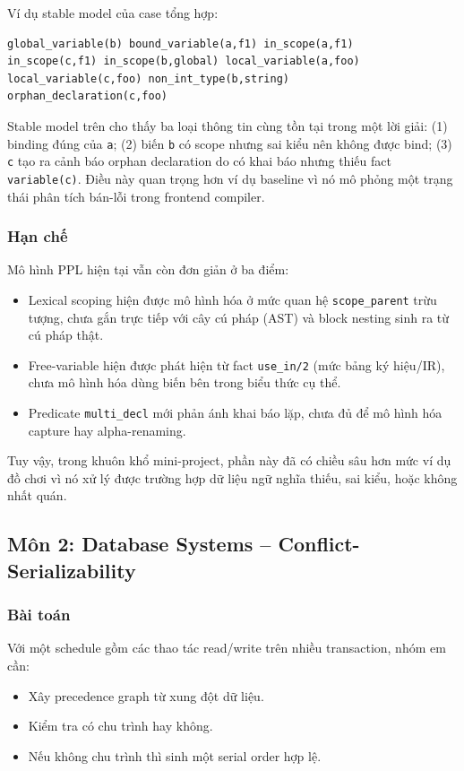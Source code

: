 ﻿\documentclass[11pt,a4paper]{article}
\begin{document}
Ví dụ stable model của case tổng hợp:
\begin{lstlisting}[language={}]
global_variable(b) bound_variable(a,f1) in_scope(a,f1)
in_scope(c,f1) in_scope(b,global) local_variable(a,foo)
local_variable(c,foo) non_int_type(b,string)
orphan_declaration(c,foo)
\end{lstlisting}

Stable model trên cho thấy ba loại thông tin cùng tồn tại trong một lời giải: (1) binding đúng của \texttt{a}; (2) biến \texttt{b} có scope nhưng sai kiểu nên không được bind; (3) \texttt{c} tạo ra cảnh báo orphan declaration do có khai báo nhưng thiếu fact \texttt{variable(c)}. Điều này quan trọng hơn ví dụ baseline vì nó mô phỏng một trạng thái phân tích bán-lỗi trong frontend compiler.

\subsubsection*{Hạn chế}
Mô hình PPL hiện tại vẫn còn đơn giản ở ba điểm:
\begin{itemize}[leftmargin=1.5em]
  \item Lexical scoping hiện được mô hình hóa ở mức quan hệ \texttt{scope\_parent} trừu tượng, chưa gắn trực tiếp với cây cú pháp (AST) và block nesting sinh ra từ cú pháp thật.
  \item Free-variable hiện được phát hiện từ fact \texttt{use\_in/2} (mức bảng ký hiệu/IR), chưa mô hình hóa dùng biến bên trong biểu thức cụ thể.
  \item Predicate \texttt{multi\_decl} mới phản ánh khai báo lặp, chưa đủ để mô hình hóa capture hay alpha-renaming.
\end{itemize}
Tuy vậy, trong khuôn khổ mini-project, phần này đã có chiều sâu hơn mức ví dụ đồ chơi vì nó xử lý được trường hợp dữ liệu ngữ nghĩa thiếu, sai kiểu, hoặc không nhất quán.

\subsection{Môn 2: Database Systems -- Conflict-Serializability}
\subsubsection*{Bài toán}
Với một schedule gồm các thao tác read/write trên nhiều transaction, nhóm em cần:
\begin{itemize}[leftmargin=1.5em]
  \item Xây precedence graph từ xung đột dữ liệu.
  \item Kiểm tra có chu trình hay không.
  \item Nếu không chu trình thì sinh một serial order hợp lệ.
\end{itemize}
\end{document}
